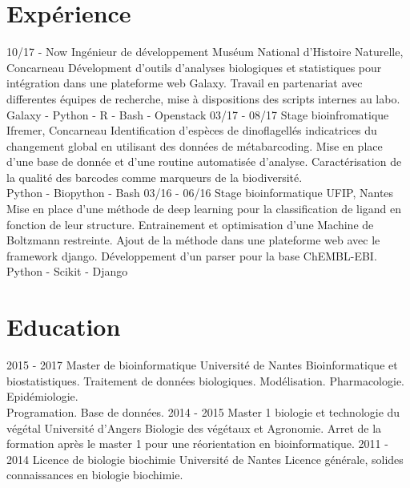 \documentclass[]{friggeri-cv}
\begin{document}
\section{Expérience}
\begin{entrylist}
  \entry
    {10/17 - Now}
    {Ingénieur de développement}
    {Muséum National d'Histoire Naturelle, Concarneau}
    {Dévelopment d'outils d'analyses biologiques et statistiques pour intégration dans une plateforme web Galaxy. Travail en partenariat avec differentes équipes de recherche, mise à dispositions des scripts internes au labo.\\
    Galaxy - Python - R - Bash - Openstack}
  \entry
    {03/17 - 08/17}
    {Stage bioinfromatique}
    {Ifremer, Concarneau}
    {Identification d'espèces de dinoflagellés indicatrices du changement global en utilisant des données de métabarcoding. Mise en place d'une base de donnée et d'une routine automatisée d'analyse. Caractérisation de la qualité des barcodes comme marqueurs de la biodiversité.\\
    Python - Biopython - Bash}
    \entry
    {03/16 - 06/16}
    {Stage bioinformatique}
    {UFIP, Nantes}
    {Mise en place d'une méthode de deep learning pour la classification de ligand en fonction de leur structure. Entrainement et optimisation d'une Machine de Boltzmann restreinte. Ajout de la méthode dans une plateforme web avec le framework django. Développement d'un parser pour la base ChEMBL-EBI.\\
    Python - Scikit - Django}
\end{entrylist}
\section{Education}
\begin{entrylist}
  \entry
    {2015 - 2017}
    {Master de bioinformatique}
    {Université de Nantes}
    {Bioinformatique et biostatistiques. Traitement de données biologiques. Modélisation. Pharmacologie. Epidémiologie.\\
    Programation. Base de données.}
  \entry
    {2014 - 2015}
    {Master 1 biologie et technologie du végétal}
    {Université d'Angers}
    {Biologie des végétaux et Agronomie. Arret de la formation après le master 1 pour une réorientation en bioinformatique.}
  \entry
    {2011 - 2014}
    {Licence de biologie biochimie}
    {Université de Nantes}
    {Licence générale, solides connaissances en biologie biochimie.\\}
\end{entrylist}
\end{document}
